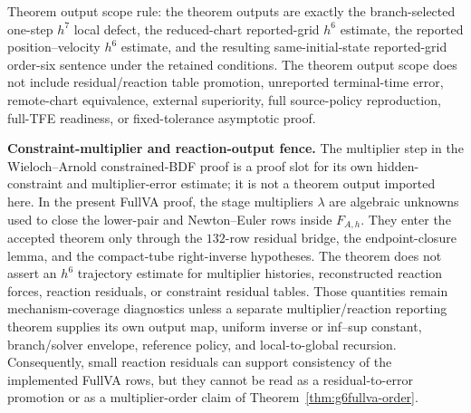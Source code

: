\documentclass[preprint,12pt]{elsarticle}
\newcommand{\tfe}{TFE}
\begin{document}
Theorem output scope rule: the theorem outputs are
exactly the branch-selected one-step \(h^7\) local defect, the reduced-chart
reported-grid \(h^6\) estimate, the reported position--velocity \(h^6\)
estimate, and the resulting same-initial-state reported-grid order-six sentence under the retained
conditions. The theorem output scope does not include residual/reaction table
promotion, unreported terminal-time error, remote-chart equivalence, external
superiority, full source-policy reproduction, full-\tfe{} readiness, or
fixed-tolerance asymptotic proof.

\noindent\textbf{Constraint-multiplier and reaction-output fence.}
The multiplier step in the Wieloch--Arnold constrained-BDF proof is a proof slot for
its own hidden-constraint and multiplier-error estimate; it is not a theorem
output imported here.  In the present FullVA proof, the stage multipliers
\(\lambda\) are algebraic unknowns used to close the lower-pair and
Newton--Euler rows inside \(F_{A,h}\).  They enter the accepted theorem only
through the \(132\)-row residual bridge, the endpoint-closure lemma, and the
compact-tube right-inverse hypotheses.  The theorem does not assert an
\(h^6\) trajectory estimate for multiplier histories, reconstructed reaction
forces, reaction residuals, or constraint residual tables.  Those quantities
remain mechanism-coverage diagnostics unless a separate multiplier/reaction
reporting theorem supplies its own output map, uniform inverse or inf--sup
constant, branch/solver envelope, reference policy, and local-to-global
recursion.  Consequently, small reaction residuals can support consistency of
the implemented FullVA rows, but they cannot be read as a residual-to-error
promotion or as a multiplier-order claim of
Theorem~\ref{thm:g6fullva-order}.
\end{document}
